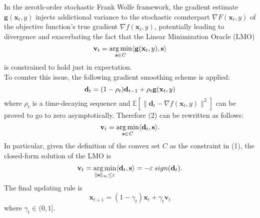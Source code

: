 In the zeroth-order stochastic Frank Wolfe framework, the gradient estimate $\mathbf{g}(\mathbf{x}_t,y)$ injects addictional variance to the stochastic counterpart $\nabla F(\mathbf{x}_t,y)$ of the objective function's true gradient $\nabla f(\mathbf{x}_{t},y)$, potentially leading to divergence and exacerbating the fact that the Linear Minimization Oracle (LMO)
\begin{equation}
	\mathbf{v}_t = \operatorname*{arg\,min}_{\mathbf{s}\in\mathit{C}}\langle \mathbf{g}(\mathbf{x}_t,y),\mathbf{s}\rangle	
\end{equation}
is constrained to hold just in expectation.\\ 
To counter this issue, the following gradient smoothing scheme is applied:
\begin{equation}
	\mathbf{d}_{t} = (1-\rho_t)\mathbf{d}_{t-1} + \rho_t\mathbf{g}(\mathbf{x}_t,y)\\
\end{equation}
where $\rho_t$ is a time-decaying sequence and $\mathbb{E}[\lVert\mathbf{d}_{t}-\nabla f(\mathbf{x}_{t},y) \rVert^2]$ can be proved to go to zero asymptotically. Therefore (2) can be rewritten as follows:
\begin{equation}
	\mathbf{v}_t = \operatorname*{arg\,min}_{\mathbf{s}\in\mathit{C}}\langle \mathbf{d}_t,\mathbf{s}\rangle.
\end{equation}
In particular, given the definition of the convex set $\mathit{C}$ as the constraint in (1), the closed-form solution of the LMO is 
\begin{equation}
	\mathbf{v}_t = \operatorname*{arg\,min}_{\lVert \mathbf{s}\rVert_{\infty}\leq\varepsilon}\langle \mathbf{d}_t,\mathbf{s}\rangle= -\varepsilon \:sign(\mathbf{d}_{t}).	
\end{equation}
The final updating rule is
\begin{equation}
	\mathbf{x}_{t+1} = (1-\gamma_t)\mathbf{x}_t + \gamma_t\mathbf{v}_t
\end{equation}
where $\gamma_t\in(0,1]$.